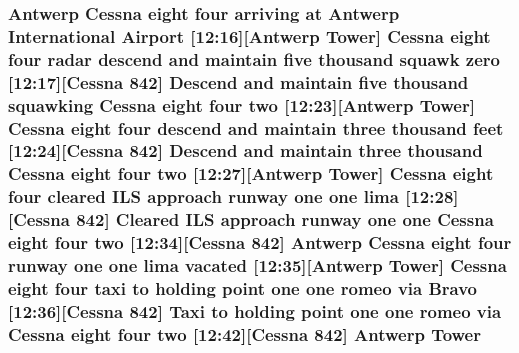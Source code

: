\subsubsection[{\texorpdfstring{Tower}{Tower}}]{\setlength{\rightskip}{0pt plus 5cm}Antwerp {\bf Cessna} eight four arriving at Antwerp International {\bf Airport} \mbox{[}12\+:16\mbox{]}\mbox{[}Antwerp Tower\mbox{]} {\bf Cessna} eight four radar descend and maintain five {\bf thousand} squawk {\bf zero} \mbox{[}12\+:17\mbox{]}\mbox{[}{\bf Cessna} 842\mbox{]} Descend and maintain five {\bf thousand} {\bf squawking} {\bf Cessna} eight four {\bf two} \mbox{[}12\+:23\mbox{]}\mbox{[}Antwerp Tower\mbox{]} {\bf Cessna} eight four descend and maintain three {\bf thousand} {\bf feet} \mbox{[}12\+:24\mbox{]}\mbox{[}{\bf Cessna} 842\mbox{]} Descend and maintain three {\bf thousand} {\bf Cessna} eight four {\bf two} \mbox{[}12\+:27\mbox{]}\mbox{[}Antwerp Tower\mbox{]} {\bf Cessna} eight four cleared I\+LS approach runway {\bf one} {\bf one} {\bf lima} \mbox{[}12\+:28\mbox{]}\mbox{[}{\bf Cessna} 842\mbox{]} Cleared I\+LS approach runway {\bf one} {\bf one} {\bf Cessna} eight four {\bf two} \mbox{[}12\+:34\mbox{]}\mbox{[}{\bf Cessna} 842\mbox{]} Antwerp {\bf Cessna} eight four runway {\bf one} {\bf one} {\bf lima} vacated \mbox{[}12\+:35\mbox{]}\mbox{[}Antwerp Tower\mbox{]} {\bf Cessna} eight four taxi to holding point {\bf one} {\bf one} {\bf romeo} via {\bf Bravo} \mbox{[}12\+:36\mbox{]}\mbox{[}{\bf Cessna} 842\mbox{]} Taxi to holding point {\bf one} {\bf one} {\bf romeo} via {\bf Cessna} eight four {\bf two} \mbox{[}12\+:42\mbox{]}\mbox{[}{\bf Cessna} 842\mbox{]} Antwerp Tower}\hypertarget{happyDay2ExpectedATC_8txt_a53ba8c5e293ec8b769402961740bf7b2}{}\label{happyDay2ExpectedATC_8txt_a53ba8c5e293ec8b769402961740bf7b2}
